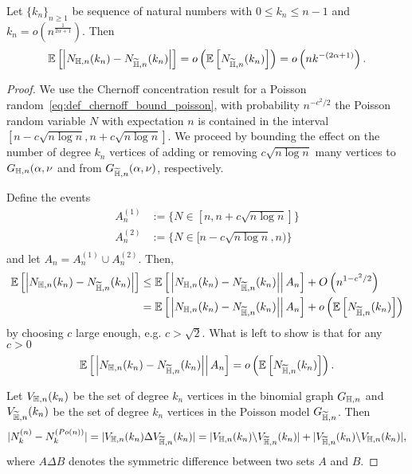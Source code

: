 \begin{lemma}\label{lem:diff_Nk_hyperbolic_binomial_poisson}
Let $\{k_n\}_{n \ge 1}$ be sequence of natural numbers with $0 \leq k_n \leq n-1$ and $k_n = o(n^{\frac{1}{2\alpha+1}})$. Then
\[
	\mathbb{E}\left[\left|N_{\mathbb{H},n}(k_n)-N_{\widetilde{\mathbb{H}},n}(k_n)\right|\right] = o\left(\mathbb{E}\left[N_{\widetilde{\mathbb{H}},n}(k_n)\right]\right) = o\left(n k^{-(2\alpha+1)}\right).
\]

\end{lemma}
\begin{proof}
We use the Chernoff concentration result for a Poisson random~\eqref{eq:def_chernoff_bound_poisson}, with probability $n^{-c^2/2}$ the Poisson random variable $N$ with expectation $n$ is contained in the interval $[n-c\sqrt{n\log n},n+c\sqrt{n \log n}]$. We proceed by bounding the effect on the number of degree $k_n$ vertices of adding or removing $c\sqrt{n\log n}$ many vertices to $G_{\mathbb{H},n}(\alpha,\nu$ and from $G_{\widetilde{\mathbb{H}},n}(\alpha,\nu)$, respectively.

Define the events
\begin{align*}
	A_n^{(1)} &:= \{N \in [n, n+c\sqrt{n \log n}]\}\\
	A_n^{(2)} &:= \{N \in [n-c\sqrt{n\log n}, n)\}\\
\end{align*}
and let $A_n = A_n^{(1)} \cup A_n^{(2)}$. Then,
\begin{align*}
\mathbb{E}\left[\left|N_{\mathbb{H},n}(k_n)-N_{\widetilde{\mathbb{H}},n}(k_n)\right|\right] 
&\le \mathbb{E}\left[\left.\left|N_{\mathbb{H},n}(k_n)-N_{\widetilde{\mathbb{H}},n}(k_n)\right|\right|A_n\right] + O\left(n^{1 - c^2/2}\right)\\
&= \mathbb{E}\left[\left.\left|N_{\mathbb{H},n}(k_n)-N_{\widetilde{\mathbb{H}},n}(k_n)\right|\right|A_n\right] + o\left(\mathbb{E}\left[N_{\widetilde{\mathbb{H}},n}(k_n)\right]\right)
\end{align*}
by choosing $c$ large enough, e.g. $c > \sqrt{2}$. What is left to show is that for any $c > 0$
\[
	 \mathbb{E}\left[\left.\left|N_{\mathbb{H},n}(k_n)-N_{\widetilde{\mathbb{H}},n}(k_n)\right|\right|A_n\right] = o\left(\mathbb{E}\left[N_{\widetilde{\mathbb{H}},n}(k_n)\right]\right).
\]


Let $V_{\mathbb{H},n}(k_n)$ be the set of degree $k_n$ vertices in the binomial graph $G_{\mathbb{H},n}$ and $V_{\widetilde{\mathbb{H}},n}(k_n)$ be the set of degree $k_n$ vertices in the Poisson model $G_{\widetilde{\mathbb{H}},n}$. Then 
\[
	|N_k^{(n)}-N_k^{(Po(n))}| = |V_{\mathbb{H},n}(k_n) \Delta V_{\widetilde{\mathbb{H}},n}(k_n)| = |V_{\mathbb{H},n}(k_n) \backslash V_{\widetilde{\mathbb{H}},n}(k_n) | + |V_{\widetilde{\mathbb{H}},n}(k_n) \backslash V_{\mathbb{H},n}(k_n) |,
\]
where $A \Delta B$ denotes the symmetric difference between two sets $A$ and $B$.


\end{proof}
